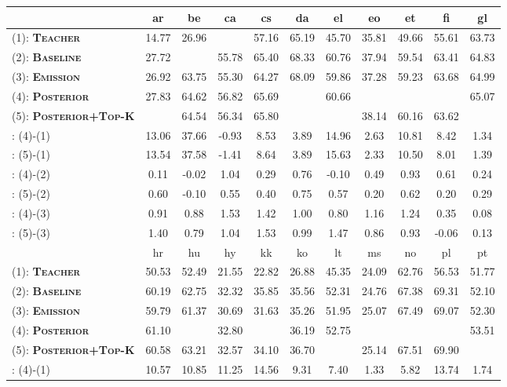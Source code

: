 \documentclass[11pt,a4paper]{article}
\begin{document}
\begin{table*}[t]
\centering
\small
\begin{tabular}{l|cccccccccc}
\hline
\hline
 &  ar & be & ca & cs & da & el & eo & et & fi & gl\\
 \hline
(1): {\bf\textsc{Teacher}}  & 14.77 & 26.96 &  & 57.16 & 65.19 & 45.70 & 35.81 & 49.66 & 55.61 & 63.73 \\
(2): {\bf\textsc{Baseline}}  & 27.72 &  & 55.78 & 65.40 & 68.33 & 60.76 & 37.94 & 59.54 & 63.41 & 64.83 \\
(3): {\bf\textsc{Emission}}  & 26.92 & 63.75 & 55.30 & 64.27 & 68.09 & 59.86 & 37.28 & 59.23 & 63.68 & 64.99 \\
(4): {\bf\textsc{Posterior}}  & 27.83 & 64.62 & 56.82 & 65.69 &  & 60.66 &  &  &  & 65.07 \\
(5): {\bf\textsc{Posterior+Top-K}}  &  & 64.54 & 56.34 & 65.80 &  &  & 38.14 & 60.16 & 63.62 &  \\
\hline
: (4)-(1) & 13.06 & 37.66 & -0.93 & 8.53 & 3.89 & 14.96 & 2.63 & 10.81 & 8.42 & 1.34 \\
: (5)-(1) & 13.54 & 37.58 & -1.41 & 8.64 & 3.89 & 15.63 & 2.33 & 10.50 & 8.01 & 1.39 \\
: (4)-(2) & 0.11 & -0.02 & 1.04 & 0.29 & 0.76 & -0.10 & 0.49 & 0.93 & 0.61 & 0.24 \\
: (5)-(2) & 0.60 & -0.10 & 0.55 & 0.40 & 0.75 & 0.57 & 0.20 & 0.62 & 0.20 & 0.29 \\
: (4)-(3) & 0.91 & 0.88 & 1.53 & 1.42 & 1.00 & 0.80 & 1.16 & 1.24 & 0.35 & 0.08 \\
: (5)-(3) & 1.40 & 0.79 & 1.04 & 1.53 & 0.99 & 1.47 & 0.86 & 0.93 & -0.06 & 0.13 \\
 \hline\hline
 & hr & hu & hy & kk & ko & lt & ms & no & pl & pt \\
 \hline
(1): {\bf\textsc{Teacher}}  & 50.53 & 52.49 & 21.55 & 22.82 & 26.88 & 45.35 & 24.09 & 62.76 & 56.53 & 51.77 \\
(2): {\bf\textsc{Baseline}}  & 60.19 & 62.75 & 32.32 & 35.85 & 35.56 & 52.31 & 24.76 & 67.38 & 69.31 & 52.10 \\
(3): {\bf\textsc{Emission}}  & 59.79 & 61.37 & 30.69 & 31.63 & 35.26 & 51.95 & 25.07 & 67.49 & 69.07 & 52.30 \\
(4): {\bf\textsc{Posterior}}  & 61.10 &  & 32.80 &  & 36.19 & 52.75 &  &  &  & 53.51 \\
(5): {\bf\textsc{Posterior+Top-K}}  & 60.58 & 63.21 & 32.57 & 34.10 & 36.70 &  & 25.14 & 67.51 & 69.90 &  \\
\hline
: (4)-(1) & 10.57 & 10.85 & 11.25 & 14.56 & 9.31 & 7.40 & 1.33 & 5.82 & 13.74 & 1.74 \\

\end{tabular}
\end{table*}
\end{document}

